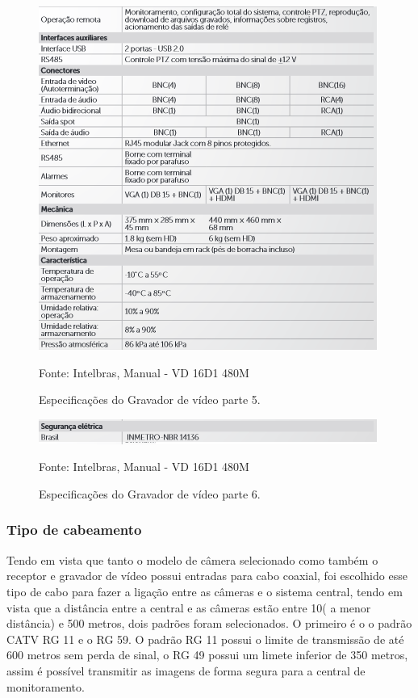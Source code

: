\begin{itemize}
\begin{itemize}
	\begin{figure}[H]
	 \centering
	\label{Especificações do Gravador de vídeo parte 5}
	 \includegraphics[keepaspectratio=true,scale=0.8]{monitoramento/19.png}
	 \caption{Especificações do Gravador de vídeo parte 5.}
	 \small{Fonte: Intelbras, Manual - VD 16D1 480M}
	\end{figure}
	

	\begin{figure}[H]
	 \centering
	\label{Especificações do Gravador de vídeo parte 6}
	 \includegraphics[keepaspectratio=true,scale=0.8]{monitoramento/20.png}
	 \caption{Especificações do Gravador de vídeo parte 6.}
	 \small{Fonte: Intelbras, Manual - VD 16D1 480M}
	\end{figure}

	\end{itemize}
\end{itemize}

\subsubsection{Tipo de cabeamento}

	Tendo em vista que tanto o modelo de câmera selecionado como também o receptor e gravador de vídeo possui entradas para cabo coaxial, foi escolhido esse tipo de cabo para fazer a ligação entre as câmeras e o sistema central, tendo em vista que a distância entre a central e as câmeras estão entre 10( a menor distância) e 500 metros, dois padrões foram selecionados.  O primeiro é o o padrão CATV RG 11 e o RG 59. O padrão RG 11 possui o limite de transmissão de até 600 metros sem perda de sinal, o RG 49 possui um limete inferior de 350 metros, assim é possível transmitir as imagens de forma segura para a central de monitoramento.
	

